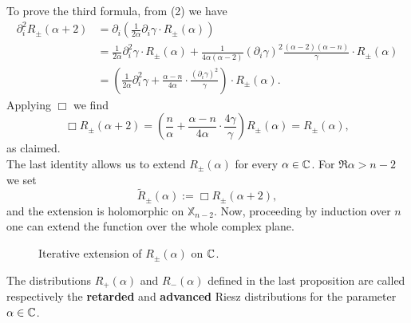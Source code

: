 To prove the third formula, from (2) we have
\[	\begin{aligned}
\partial_i^2R_\pm(\alpha+2)&=\partial_i\left(\frac{1}{2\alpha}\partial_i\gamma\cdot R_\pm(\alpha)\right)\\
&=\frac{1}{2\alpha}\partial_i^2\gamma\cdot R_\pm(\alpha)+\frac{1}{4\alpha(\alpha-2)}(\partial_i\gamma)^2\frac{(\alpha-2)(\alpha-n)}{\gamma}\cdot R_\pm(\alpha)\\
&=\left(\frac{1}{2\alpha}\partial_i^2\gamma+\frac{\alpha-n}{4\alpha}\cdot\frac{(\partial_i\gamma)^2}{\gamma}\right)\cdot R_\pm(\alpha).
\end{aligned}			\]
Applying $\Box$ we find
\[	\Box R_\pm(\alpha+2)=\left(\frac{n}{\alpha}+\frac{\alpha-n}{4\alpha}\cdot\frac{4\gamma}{\gamma}\right)R_\pm(\alpha)=R_\pm(\alpha),		\]
as claimed.\\
The last identity allows us to extend $R_\pm(\alpha)$ for every $\alpha\in{\mathbb C}$.
For $\Re\alpha>n-2$ we set
\[	\widetilde{R}_\pm(\alpha):=\Box R_\pm(\alpha+2),		\]
and the extension is holomorphic on $\mathds{X}_{n-2}$. Now, proceeding by induction over $n$ one can extend the function over the whole complex plane.\endproof

\begin{figure}
\centering
{}
\caption{Iterative extension of $R_\pm(\alpha)$ on ${\mathbb C}$.}

\end{figure}


\begin{definition}
	The distributions $R_+(\alpha)$ and $R_-(\alpha)$ defined in the last proposition are called  respectively the \textbf{retarded} and \textbf{advanced} Riesz distributions for the parameter $\alpha\in{\mathbb C}$.
\end{definition}


